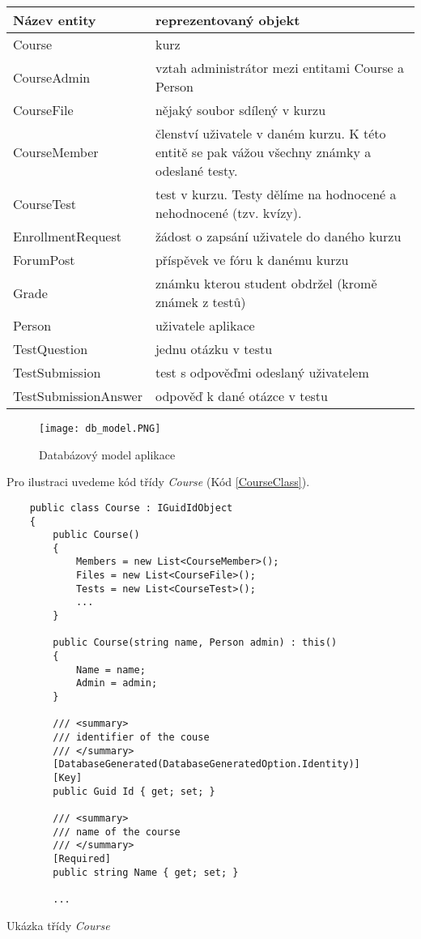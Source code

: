 \begin{table}[ht]
	\centering
	\begin{tabular}{| l | p{9cm} |}
		\hline
		Název entity & reprezentovaný objekt \\
		\hline \hline
		Course & kurz \\ \hline
		CourseAdmin & vztah administrátor mezi entitami Course a Person \\ \hline		
		CourseFile & nějaký soubor sdílený v kurzu \\ \hline
		CourseMember & členství uživatele v daném kurzu. 
		K této entitě se pak vážou všechny známky a odeslané testy. \\ \hline
		CourseTest & test v kurzu. Testy dělíme na hodnocené a nehodnocené (tzv. kvízy). \\ \hline
		EnrollmentRequest & žádost o zapsání uživatele do daného kurzu \\ \hline
		ForumPost & příspěvek ve fóru k danému kurzu \\ \hline
		Grade & známku kterou student obdržel (kromě známek z testů) \\ \hline
		Person & uživatele aplikace \\ \hline
		TestQuestion & jednu otázku v testu \\ \hline
		TestSubmission & test s odpověďmi odeslaný uživatelem \\ \hline
		TestSubmissionAnswer & odpověď k dané otázce v testu \\
		\hline
	\end{tabular}
\end{table}

\newpage

\begin{figure}
	\centering
	\texttt{[image: db\_model.PNG]}
	\caption{Databázový model aplikace}
	\label{fig:DbModel}
\end{figure}

\newpage

Pro ilustraci uvedeme kód třídy \textit{Course} (Kód \ref{CourseClass}).

\begin{program}
	\begin{lstlisting}
	public class Course : IGuidIdObject
	{
		public Course()
		{
			Members = new List<CourseMember>();
			Files = new List<CourseFile>();
			Tests = new List<CourseTest>();
			...
		}
		
		public Course(string name, Person admin) : this()
		{
			Name = name;
			Admin = admin;
		}
		
		/// <summary>
		/// identifier of the couse
		/// </summary>
		[DatabaseGenerated(DatabaseGeneratedOption.Identity)]
		[Key]
		public Guid Id { get; set; }
		
		/// <summary>
		/// name of the course
		/// </summary>
		[Required]
		public string Name { get; set; }
		
		...
	\end{lstlisting}
	\caption{Ukázka třídy \textit{Course}}
	\label{CourseClass}
\end{program}

